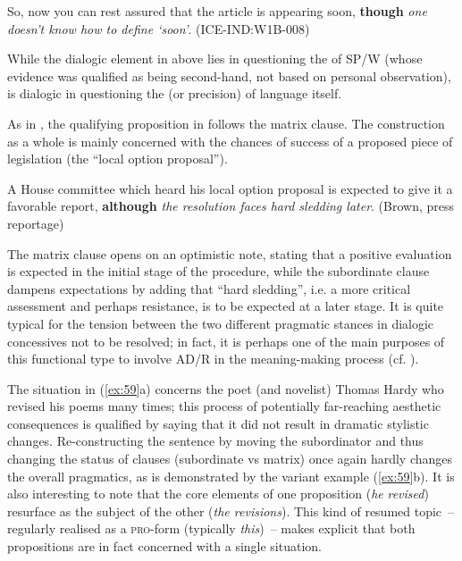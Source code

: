 \ea\label{ex:57}\label{bkm:Ref487559681}So, now you can rest assured that the article is appearing soon, \textbf{though} \textit{one doesn’t know how to define ‘soon’}. (ICE-IND:W1B-008)\\
\z

While the dialogic element in  above lies in questioning the  of SP/W (whose evidence was qualified as being second-hand, not based on personal observation),  is dialogic in questioning the  (or precision) of language itself.

As in , the qualifying proposition in  follows the matrix clause. The construction as a whole is mainly concerned with the chances of success of a proposed piece of legislation (the “local option proposal”).

\ea\label{ex:58}\label{bkm:Ref487629172}A House committee which heard his local option proposal is expected to give it a favorable report, \textbf{although} \textit{the resolution faces hard sledding later}. (Brown, press reportage)\\
\z

The matrix clause opens on an optimistic note, stating that a positive evaluation is expected in the initial stage of the procedure, while the subordinate clause dampens expectations by adding that “hard sledding”, i.e. a more critical assessment and perhaps resistance, is to be expected at a later stage. It is quite typical for the tension between the two different pragmatic stances in dialogic concessives not to be resolved; in fact, it is perhaps one of the main purposes of this functional type to involve AD/R in the meaning-making process (cf. ).

\begin{sloppypar}
The situation in (\ref{ex:59}a) concerns the poet (and novelist) Thomas Hardy who revised his poems many times; this process of potentially far-reaching aesthetic consequences is qualified by saying that it did not result in dramatic stylistic changes. Re-constructing the sentence by moving the subordinator and thus changing the status of clauses (subordinate vs matrix) once again hardly changes the overall pragmatics, as is demonstrated by the variant example (\ref{ex:59}b). It is also interesting to note that the core elements of one proposition (\textit{he\textsubscript{} }\textit{revised}) resurface as the subject of the other (\textit{the revisions}). This kind of resumed topic~– regularly realised as a \textsc{pro}-form (typically \textit{this})~– makes explicit that both propositions are in fact concerned with a single situation.
\end{sloppypar}

